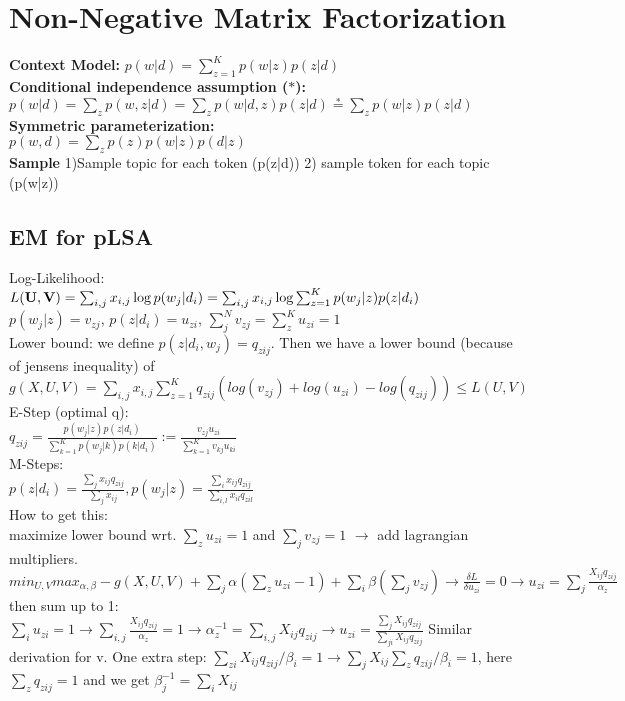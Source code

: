 \section{Non-Negative Matrix Factorization}
\textbf{Context Model:} $p(w | d) = \sum_{z=1}^K p(w | z) p(z | d)$\\
\textbf{Conditional independence assumption ($*$):}\\
$p(w|d) = \sum_z p(w,z|d) = \sum_z p(w|d,z)p(z|d) \stackrel{*}{=} \sum_z p(w|z)p(z|d)$\\
\textbf{Symmetric parameterization:}\\
$p(w, d) = \sum_z p(z)p(w | z) p(d | z)$\\
\textbf{Sample} 1)Sample topic for each token (p(z|d)) 2) sample token for each topic (p(w|z))
\subsection*{EM for pLSA}
Log-Likelihood: $L(\mathbf{U}, \mathbf{V}) = \sum_{i,j} x_{i,j}\log p(w_j|d_i) \\
= \sum_{i,j}x_{i,j} \log \sum_{z=1}^K p(w_j|z)p(z|d_i)$ \\ 
$ p(w_j|z) = v_{zj}$, $p(z|d_i) = u_{zi}$, $\sum_j^N v_{zj} = \sum_z^K u_{zi} = 1$\\
Lower bound: we define $p(z|d_i,w_j) = q_{zij}$. Then we have a lower bound (because of jensens inequality) of $g(X,U,V) =  \sum_{i,j} x_{i,j}  \sum_{z=1}^K q_{zij}( log(v_{zj})+ log(u_{zi}) - log(q_{zij})) \leq L(U,V)$ \\
E-Step (optimal q):\\
$q_{zij} = \frac{p(w_j|z)p(z|d_i)}{\sum_{k=1}^K p(w_j|k)p(k|d_i)} := \frac{v_{zj}u_{zi}}{\sum_{k=1}^K v_{kj}u_{ki}}$\\
M-Steps:\\
$p(z|d_i) = \frac{\sum_j x_{ij}q_{zij}}{\sum_j x_{ij}}, p(w_j|z) = \frac{\sum_i x_{ij}q_{zij}}{\sum_{i,l}x_{il}q_{zil}}$\\
How to get this: \\
maximize lower bound wrt. $\sum_z u_{zi} = 1$ and $\sum_j v_{zj}=1$ $\rightarrow$ add lagrangian multipliers. $min_{U,V}max_{\alpha,\beta}-g(X,U,V)+\sum_j \alpha (\sum_z u_{zi}-1)+ \sum_i \beta(\sum_j v_{zj}) \rightarrow \frac{\delta L}{\delta u_{zi}} = 0 \rightarrow u_{zi} = \sum_j \frac{X_{ij}q_{zij}}{\alpha_z}$ then sum up to 1: $\sum_i u_{zi} = 1 \rightarrow \sum_{i,j}\frac{X_{ij}q_{zij}}{\alpha_z}= 1 \rightarrow \alpha_z^{-1} = \sum_{i,j} X_{ij}q_{zij} \rightarrow u_{zi} = \frac{\sum_j X_{ij}q_{zij}}{\sum_{ji}X_{ij}q_{zij}}$ Similar derivation for v. One extra step: $\sum_{zi}X_{ij}q_{zij}/\beta_i = 1 \rightarrow \sum_j X_{ij} \sum_z q_{zij} / \beta_i = 1$, here $\sum_z q_{zij} = 1$ and we get $\beta_j^{-1} = \sum_i X_{ij}$

